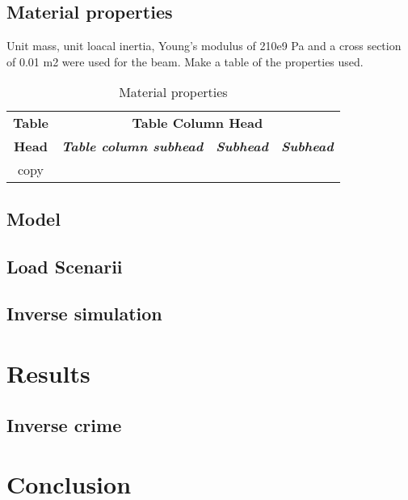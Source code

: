 \documentclass[conference]{IEEEtran}
\begin{document}
\subsection{Material properties}
Unit mass, unit loacal inertia, Young's modulus of 210e9 Pa and a cross section of 0.01 m2 were used for the beam.
Make a table of the properties used.
\begin{table}[htbp]
\caption{Material properties}
\begin{center}
\begin{tabular}{|c|c|c|c|}
\hline
\textbf{Table}&\multicolumn{3}{|c|}{\textbf{Table Column Head}} \\
\cline{2-4} 
\textbf{Head} & \textbf{\textit{Table column subhead}}& \textbf{\textit{Subhead}}& \textbf{\textit{Subhead}} \\
\hline
copy& & &  \\
\hline
\end{tabular}
\label{tab1}
\end{center}
\end{table}
\subsection{Model}

\subsection{Load Scenarii}

\subsection{Inverse simulation}

\section{Results}
\subsection{Inverse crime}


\section{Conclusion}
\end{document}

